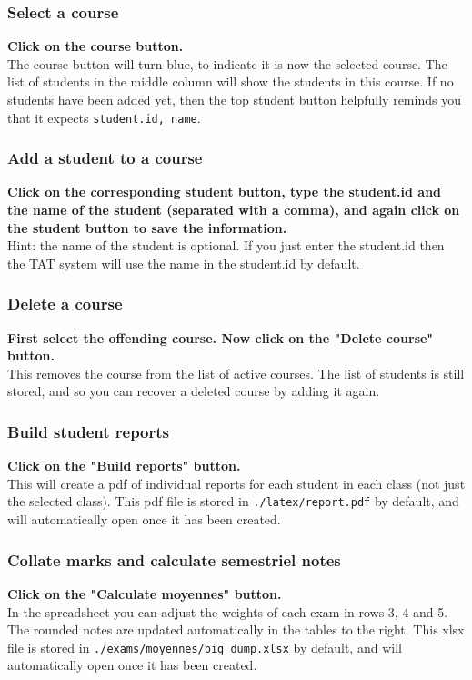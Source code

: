 \documentclass[10pt]{article}
\begin{document}
\subsubsection{Select a course}
\textbf{Click on the course button.} \\
The course button will turn blue, to indicate it is now the selected course. The list of students in the middle column will show the students in this course. If no students have been added yet, then the top student button helpfully reminds you that it expects \texttt{student.id, name}.

\subsubsection{Add a student to a course}
\textbf{Click on the corresponding student button, type the student.id and the name of the student (separated with a comma), and again click on the student button to save the information.} \\
Hint: the name of the student is optional. If you just enter the student.id then the TAT system will use the name in the student.id by default.

\subsubsection{Delete a course}
\textbf{First select the offending course. Now click on the "Delete course" button.} \\
This removes the course from the list of active courses. The list of students is still stored, and so you can recover a deleted course by adding it again.

\subsubsection{Build student reports}
\textbf{Click on the "Build reports" button.} \\
This will create a pdf of individual reports for each student in each class (not just the selected class). This pdf file is stored in \texttt{./latex/report.pdf} by default, and will automatically open once it has been created.

\subsubsection{Collate marks and calculate semestriel notes}
\textbf{Click on the "Calculate moyennes" button.} \\
In the spreadsheet you can adjust the weights of each exam in rows 3, 4 and 5. The rounded notes are updated automatically in the tables to the right. This xlsx file is stored in \texttt{./exams/moyennes/big\_dump.xlsx} by default, and will automatically open once it has been created.
\end{document}
